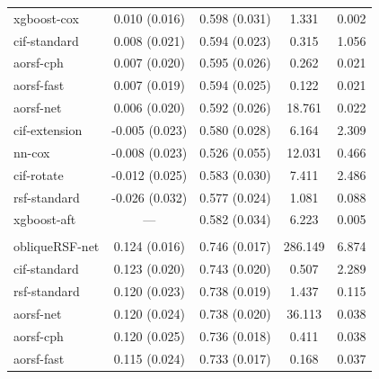 \documentclass{article}\usepackage[]{graphicx}\usepackage[]{xcolor}
\newenvironment{knitrout}{}{} %
\begin{document}
\begin{knitrout}
\begin{longtable}[t]{lcccc}
\hspace{1em}xgboost-cox & 0.010 (0.016) & 0.598 (0.031) & 1.331 & 0.002\\
\hspace{1em}cif-standard & 0.008 (0.021) & 0.594 (0.023) & 0.315 & 1.056\\
\hspace{1em}aorsf-cph & 0.007 (0.020) & 0.595 (0.026) & 0.262 & 0.021\\
\hspace{1em}aorsf-fast & 0.007 (0.019) & 0.594 (0.025) & 0.122 & 0.021\\
\hspace{1em}aorsf-net & 0.006 (0.020) & 0.592 (0.026) & 18.761 & 0.022\\
\hspace{1em}cif-extension & -0.005 (0.023) & 0.580 (0.028) & 6.164 & 2.309\\
\hspace{1em}nn-cox & -0.008 (0.023) & 0.526 (0.055) & 12.031 & 0.466\\
\hspace{1em}cif-rotate & -0.012 (0.025) & 0.583 (0.030) & 7.411 & 2.486\\
\hspace{1em}rsf-standard & -0.026 (0.032) & 0.577 (0.024) & 1.081 & 0.088\\
\hspace{1em}xgboost-aft & --- & 0.582 (0.034) & 6.223 & 0.005\\
\addlinespace[0.3em]
\multicolumn{5}{l}{\textit{\textbf{GBSG II; recurrence or death, n = 686, p = 10}}}\\
\hline
\hspace{1em}obliqueRSF-net & 0.124 (0.016) & 0.746 (0.017) & 286.149 & 6.874\\
\hspace{1em}cif-standard & 0.123 (0.020) & 0.743 (0.020) & 0.507 & 2.289\\
\hspace{1em}rsf-standard & 0.120 (0.023) & 0.738 (0.019) & 1.437 & 0.115\\
\hspace{1em}aorsf-net & 0.120 (0.024) & 0.738 (0.020) & 36.113 & 0.038\\
\hspace{1em}aorsf-cph & 0.120 (0.025) & 0.736 (0.018) & 0.411 & 0.038\\
\hspace{1em}aorsf-fast & 0.115 (0.024) & 0.733 (0.017) & 0.168 & 0.037\\

\end{longtable}
\end{knitrout}
\end{document}
